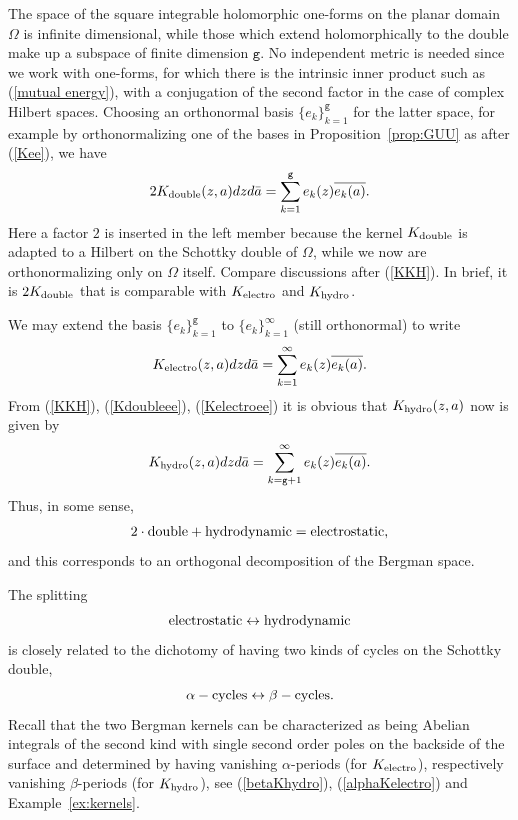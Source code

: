 \documentclass[reqno,12pt]{article}
\theoremstyle{plain}
\theoremstyle{definition}
\numberwithin{equation}{section}
\numberwithin{figure}{section}
\begin{document}
The space of the square integrable holomorphic one-forms on the planar domain $\Omega$ 
is infinite dimensional, while those which extend holomorphically to the double make up a subspace of finite
dimension $\texttt{g}$. No independent metric is needed since we work with one-forms, for which there is the  intrinsic 
inner product such as (\ref{mutual energy}), with a conjugation of the second factor in the case of complex
Hilbert spaces.  Choosing an orthonormal basis $\{e_k\}_{k=1}^\texttt{g}$ for the latter space,
for example by orthonormalizing one of the bases in Proposition~\ref{prop:GUU}
as after (\ref{Kee}), we have
\begin{equation}\label{Kdoubleee}
2K_{\rm double}(z,a)dzd\bar{a}=\sum_{k=1}^\texttt{g} e_k(z)\overline{e_k(a)}.
\end{equation}
Here a factor $2$ is inserted in the left member because the kernel $K_{\rm double}$ is adapted to a Hilbert
on the Schottky double of $\Omega$, while we now are orthonormalizing only on $\Omega$ itself.
Compare discussions after (\ref{KKH}). In brief, it is $2K_{\rm double}$ that is comparable with 
$K_{\rm electro}$ and $K_{\rm hydro}$.

We may extend the basis $\{e_k\}_{k=1}^\texttt{g}$ to $\{e_k\}_{k=1}^\infty$ (still orthonormal) to write
\begin{equation}\label{Kelectroee}
K_{\rm electro}(z,a)dzd\bar{a}=\sum_{k=1}^\infty e_k(z)\overline{e_k(a)}.
\end{equation}
From (\ref{KKH}), (\ref{Kdoubleee}), (\ref{Kelectroee}) it is obvious that $K_{\rm hydro}(z,a)$
now is given by
\begin{equation}\label{Khydroee}
K_{\rm hydro}(z,a)dzd\bar{a}=\sum_{k=\texttt{g}+1}^\infty e_k(z)\overline{e_k(a)}.
\end{equation}
Thus, in some sense, 
$$
2\cdot {\rm double}+{\rm hydrodynamic}= {\rm electrostatic},
$$
and this corresponds to an orthogonal decomposition of the Bergman space.

The splitting 
$$
{\rm electrostatic}\leftrightarrow {\rm hydrodynamic}
$$
is closely related to the dichotomy of having two kinds of cycles on the Schottky double,
$$
\alpha-{\rm cycles} \leftrightarrow \beta-{\rm cycles}.
$$
Recall that the two Bergman kernels can be characterized as being 
Abelian integrals of the second kind with single second order poles on the backside of the 
surface and determined by having vanishing $\alpha$-periods (for $K_{\rm electro}$), respectively vanishing
$\beta$-periods (for $K_{\rm hydro}$), see (\ref{betaKhydro}), (\ref{alphaKelectro}) and Example~\ref{ex:kernels}. 
\end{document}
